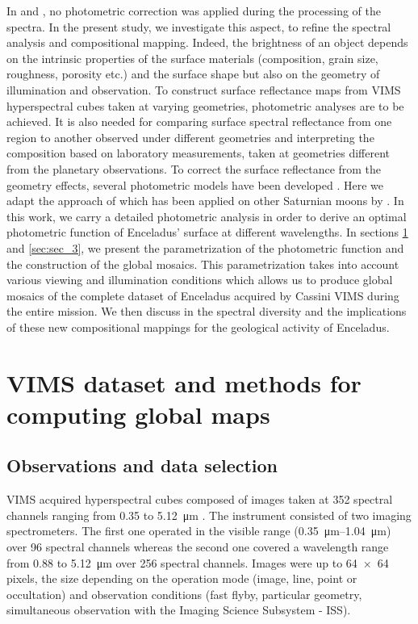 \documentclass{arxiv-icarus}
\begin{document}
In \cite{Combe2019} and \citep{Scipioni2017}, no photometric correction was applied during the processing of the spectra. In the present study, we investigate this aspect, to refine the spectral analysis and compositional mapping. Indeed, the brightness of an object depends on the intrinsic properties of the surface materials (composition, grain size, roughness, porosity etc.) and the surface shape but also on the geometry of illumination and observation. To construct surface reflectance maps from VIMS hyperspectral cubes taken at varying geometries, photometric analyses are to be achieved. It is also needed for comparing surface spectral reflectance from one region to another observed under different geometries and interpreting the composition based on laboratory measurements, taken at geometries different from the planetary observations. To correct the surface reflectance from the geometry effects, several photometric models have been developed \citep[\eg][]{Hapke1963, Hapke1981, Hapke2012, Minnaert1941, Shkuratov2011}. Here we adapt the approach of \cite{Shkuratov2011} which has been applied on other Saturnian moons by \cite{Filacchione2018a, Filacchione2018}.
In this work, we carry a detailed photometric analysis in order to derive an optimal photometric function of Enceladus' surface at different wavelengths. In sections \ref{sec:sec_2} and \ref{sec:sec_3}, we present the parametrization of the photometric function and the construction of the global mosaics. This parametrization takes into account various viewing and illumination conditions which allows us to produce global mosaics of the complete dataset of Enceladus acquired by Cassini VIMS during the entire mission. We then discuss in  the spectral diversity and the implications of these new compositional mappings for the geological activity of Enceladus.


\section{VIMS dataset and methods for computing global maps}\label{sec:sec_2}
\subsection{Observations and data selection}\label{sec:sec_2.1}

VIMS acquired hyperspectral cubes composed of images taken at 352 spectral channels ranging from \num{0.35} to \SI{5.12}{\um} \citep{Brown2004}. The instrument consisted of two imaging spectrometers. The first one operated in the visible range (\SIrange{0.35}{1.04}{\um}) over \num{96} spectral channels whereas the second one covered a wavelength range from \num{0.88} to \SI{5.12}{\um} over \num{256} spectral channels. Images were up to \num{64 x 64} pixels, the size depending on the operation mode (image, line, point or occultation) and observation conditions (fast flyby, particular geometry, simultaneous observation with the Imaging Science Subsystem - ISS).
\end{document}
